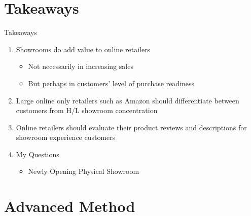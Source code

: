 \documentclass[mathserif, xcolor=table]{beamer}
\begin{document}
\section{Takeaways}
\begin{frame}{Takeaways}
	\begin{enumerate}
		\item Showrooms do add value to online retailers
		\begin{itemize}
			\item Not necessarily in increasing sales
			\item But perhaps in customers’ level of purchase readiness
		\end{itemize}
		\item Large online only retailers such as Amazon should differentiate between customers from H/L showroom concentration
		\item Online retailers should evaluate their product reviews and descriptions for showroom experience customers
		\item My Questions
		\begin{itemize}
			\item Newly Opening Physical Showroom
		\end{itemize}
	\end{enumerate}
\end{frame}

\section{Advanced Method}

%
\end{document}

